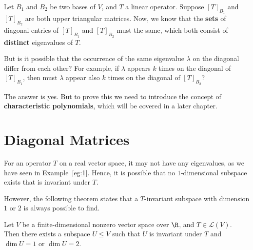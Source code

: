 \documentclass[thmcnt=section, color=blue, 12pt]{my-elegantbook}
\begin{document}
\par Let $B_1$ and $B_2$ be two bases of $V$, and $T$ a linear operator. Suppose $[T]_{B_1}$ and $[T]_{B_2}$ are both upper triangular matrices. Now, we know that the \textbf{sets} of diagonal entries of $[T]_{B_1}$ and $[T]_{B_2}$ must the same, which both consist of \textbf{distinct} eigenvalues of $T$. 

\par But is it possible that the occurrence of the same eigenvalue $\lambda$ on the diagonal differ from each other? For example, if $\lambda$ appears $k$ times on the diagonal of $[T]_{B_1}$, then must $\lambda$ appear also $k$ times on the diagonal of $[T]_{B_2}$?

\par The answer is yes. But to prove this we need to introduce the concept of \textbf{characteristic polynomials}, which will be covered in a later chapter.



\section{Diagonal Matrices}


\par For an operator $T$ on a real vector space, it may not have any eigenvalues, as we have seen in Example~\ref{eg:1}. Hence, it is possible that no $1$-dimensional subspace exists that is invariant under $T$. 

\par However, the following theorem states that a $T$-invariant subspace with dimension $1$ or $2$ is always possible to find.

\begin{theorem} \label{thm:6}
    Let $V$ be a finite-dimensional nonzero vector space over $\R$, and $T \in \mathcal{L}(V)$. Then there exists a subspace $U \leq V$ such that $U$ is invariant under $T$ and $\dim U = 1$ or $\dim U = 2$.
\end{theorem}
\end{document}
